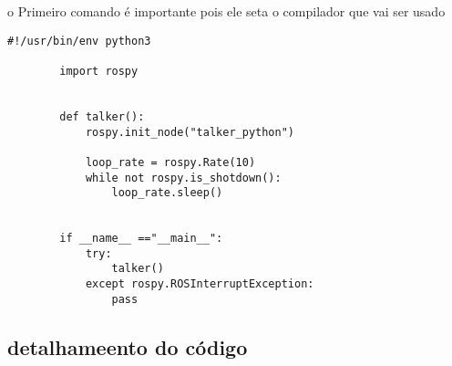 \documentclass[letterpaper]{article}
\begin{document}
    o Primeiro comando é importante pois ele seta o compilador que vai ser usado
    \begin{lstlisting}[style=pythonStyle, title= base de um nó em python]
         #!/usr/bin/env python3
        
        import rospy
        
        
        def talker():
            rospy.init_node("talker_python")
        
            loop_rate = rospy.Rate(10)
            while not rospy.is_shotdown():
                loop_rate.sleep()
        
        
        if __name__ =="__main__":
            try:
                talker()
            except rospy.ROSInterruptException:
                pass    
    \end{lstlisting}
    \subsection{detalhameento do código}
\end{document}
